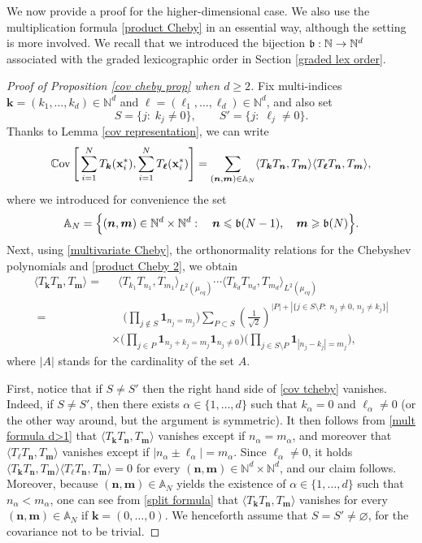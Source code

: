 \documentclass[a4paper,11pt]{article}
\numberwithin{equation}{section}
\theoremstyle{definition}
\newcommand{\eq}{\begin{equation}}
\newcommand{\qe}{\end{equation}}
\newcommand{\N}{\mathbb{N}}
\newcommand{\bs}{\boldsymbol}
\newcommand{\bv}{\mathbf}
\renewcommand{\leq}{\leqslant}
\renewcommand{\geq}{\geqslant}
\renewcommand{\emptyset}{\varnothing}
\begin{document}
We now provide a proof for the higher-dimensional case. We also use the multiplication formula \eqref{product Cheby} in an essential way, although the setting is  more involved. We recall that we introduced the bijection $\frak b:\N\to\N^d$ associated with the graded lexicographic order in Section \ref{graded lex order}.

\begin{proof}[Proof of Proposition \ref{cov cheby prop} when $d\geq 2$] Fix multi-indices $\bs k=(k_1,\ldots,k_d)\in\N^d$ and $\bs \ell=(\ell_1,\ldots,\ell_d)\in\N^d$, and also set
\[
S=\big\{j: \; k_j\neq 0\big\},\qquad  S'=\big\{j: \; \ell_j\neq 0\big\}.
\]
Thanks to Lemma \ref{cov representation}, we can write
\eq
\label{cov tcheby}
\mathbb C{\rm ov}\left[\,\sum_{i=1}^NT_{\bs k}(\bv x_i^*),\sum_{i=1}^NT_{\bs \ell}(\bv x_i^*)\right]= \sum_{(\bs n,\bs m)\in\mathbb A_N} \langle T_{\bs k}T_{\bs n},T_{\bs m}\rangle\langle T_{\bs \ell}T_{\bs n},T_{\bs m}\rangle,
\qe
where we introduced for convenience the set
\eq
\label{def AN}
\mathbb A_N=\Big\{(\bs n,\bs m)\in\N^d\times\N^d : \quad \bs n\leq \frak b(N-1),\quad \bs m\geq \frak b(N)\Big\}.
\qe
Next, using \eqref{multivariate Cheby}, the orthonormality
relations for the Chebyshev polynomials and \eqref{product Cheby 2}, we  obtain
\begin{align}
\label{split formula}
\langle T_{\bs k}T_{\bs n},T_{\bs m}\rangle = &\; \; \langle T_{k_1}T_{n_1},T_{m_1}\rangle_{L^2(\mu_{eq})}\cdots \langle T_{k_d}T_{n_d},T_{m_d}\rangle_{L^2(\mu_{eq})}\\
 \; = &\quad \Big(\prod_{j\notin S}\bv 1_{n_j=m_j}\Big) \sum_{P \subset S}
\left(\frac{1}{\sqrt{2}}\right)^{| P| +|\{j\in S\setminus P :\; n_j\neq 0, \, n_j\neq k_j\}|}
\nonumber\\
\label{mult formula d>1}
 & \times \Big(\prod_{j\in P}\bv 1_{n_j+k_j=m_j}\bv 1_{n_j\neq 0}\Big)
 \Big(\prod_{j\in S\setminus P}\bv 1_{|n_j-k_j|=m_j}\Big),
\end{align}
where $|A|$ stands for the cardinality of the set $A$.

First, notice that if $S\neq S'$ then the right hand side of
\eqref{cov tcheby} vanishes.  Indeed, if $S\neq S'$, then there exists
$\alpha\in\{1,\ldots,d\}$ such that $k_\alpha=0$ and $\ell _\alpha\neq
0$ (or the other way around, but the argument is symmetric). It then
follows from \eqref{mult formula d>1} that $\langle T_{\bs k}T_{\bs
  n},T_{\bs m}\rangle$ vanishes except if $n_\alpha=m_\alpha$, and
moreover that $\langle T_{\bs \ell}T_{\bs n},T_{\bs m}\rangle$
vanishes except if  $|n_\alpha\pm \ell_\alpha |=m_\alpha$. Since
$\ell_\alpha\neq 0$, it holds  $\langle T_{\bs k}T_{\bs n},T_{\bs
  m}\rangle\langle T_{\bs \ell}T_{\bs n},T_{\bs m}\rangle=0$   for
every $(\bs n,\bs m)\in\N^d\times\N^d$, and our claim
follows. Moreover, because $(\bs n,\bs m)\in\mathbb A_N$ yields the
existence of $\alpha\in\{1,\ldots,d\}$ such that $n_\alpha<m_\alpha$,
one can see from \eqref{split formula} that $\langle T_{\bs
  k}T_{\bs n},T_{\bs m}\rangle$ vanishes for every $(\bs n,\bs
m)\in\mathbb A_N$ if $\bs k=(0,\ldots,0)$.  We
henceforth assume that $S=S'\neq \emptyset$, for the covariance not to be trivial.


\end{proof}
\end{document}
